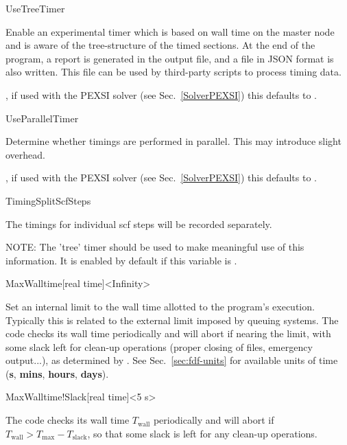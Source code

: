   \begin{fdflogicalF}{UseTreeTimer}
  
    Enable an experimental timer which is based on wall time on the
    master node and is aware of the tree-structure of the timed
    sections. At the end of the program, a report is generated in the
    output file, and a  file in JSON format is also
    written.  This file can be used by
    third-party scripts to process timing data.
  
    \note, if used with the PEXSI solver (see Sec.~\ref{SolverPEXSI})
    this defaults to \fdftrue.
  
  \end{fdflogicalF}
  
  
  \begin{fdflogicalT}{UseParallelTimer}
  
    Determine whether timings are performed in parallel. This may
    introduce slight overhead.
  
    \note, if used with the PEXSI solver (see Sec.~\ref{SolverPEXSI})
    this defaults to \fdffalse.
  
  \end{fdflogicalT}
  
  \begin{fdflogicalF}{TimingSplitScfSteps}
  
    The timings for individual scf steps will be recorded separately.
  
    NOTE: The 'tree' timer should be used to make meaningful use of this
    information. It is enabled by default if this variable is \fdftrue.
  
  \end{fdflogicalF}
  
  \begin{fdfentry}{MaxWalltime}[real time]<Infinity>
  
    Set an internal limit to the wall time allotted to the
    program's execution. Typically this is related to the external limit
    imposed by queuing systems. The code checks its wall time periodically
    and will abort if nearing the limit, with some slack left for clean-up
    operations (proper closing of files, emergency output...), as determined
    by . See Sec.~\ref{sec:fdf-units} for available
    units of time (\textbf{s}, \textbf{mins}, \textbf{hours}, \textbf{days}).
  
  \end{fdfentry}
  
  
  \begin{fdfentry}{MaxWalltime!Slack}[real time]<5 s>
  
    The code checks its wall time $T_{\mathrm{wall}}$ periodically and will
    abort if $T_{\mathrm{wall}} > T_{\mathrm{max}} - T_{\mathrm{slack}}$, so that
    some slack is left for any clean-up operations.
  
  \end{fdfentry}

